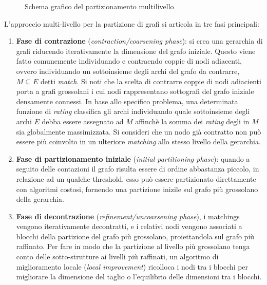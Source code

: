 \begin{figure}[h!]
    \centering
    
    \caption{Schema grafico del partizionamento multilivello}
    \label{fig:multi-level-graph-partitioning}
\end{figure}

L'approccio multi-livello per la partizione di grafi si articola in tre fasi principali:
\begin{enumerate}
    \item \textbf{Fase di contrazione} (\textit{contraction/coarsening phase}):
    si crea una gerarchia di grafi riducendo iterativamente la dimensione del grafo iniziale.
    Questo viene fatto comunemente individuando e contraendo coppie di nodi adiacenti, ovvero individuando un
    sottoinsieme degli archi del grafo da contrarre, $M \subseteq E $ detti \textit{match}.
    Si noti che la scelta di contrarre coppie di nodi adiacienti porta a grafi grossolani i cui nodi rappresentano
    sottografi del grafo iniziale densamente connessi.
    In base allo specifico problema, una determinata funzione di \textit{rating} classifica gli archi individuando
    quale sottoinsieme degli archi $E$ debba essere assegnato ad $M$ affinch\`e la somma dei \textit{rating} degli in
    $M$ sia globalmente massimizzata.
    Si consideri che un nodo gi\`a contratto non pu\`o essere pi\`u coinvolto in un ulteriore \textit{matching}
    allo stesso livello della gerarchia.
    \item \textbf{Fase di partizionamento iniziale} (\textit{initial partitioning phase}): quando a seguito delle
    contazioni il grafo risulta essere di ordine abbastanza piccolo, in relazione ad un qualche threshold,
    esso pu\`o essere partizionato direttamente con algoritmi costosi, fornendo una partizione inizile sul grafo
    pi\`u grossolano della gerarchia.
    \item \textbf{Fase di decontrazione} (\textit{refinement/uncoarsening phase}), i matchings vengono iterativamente
    decontratti, e i relativi nodi vengono associati a blocchi della partizione del grafo pi\`u grossolano,
    proiettandola sul grafo pi\`u raffinato.
    Per fare in modo che la partizione al livello pi\`u grossolano tenga conto delle sotto-strutture ai livelli
    pi\`u raffinati, un algoritmo di miglioramento locale (\textit{local improvement}) ricolloca i nodi tra i
    blocchi per migliorare la dimensione del taglio o l'equilibrio delle dimensioni tra i blocchi.
\end{enumerate}





